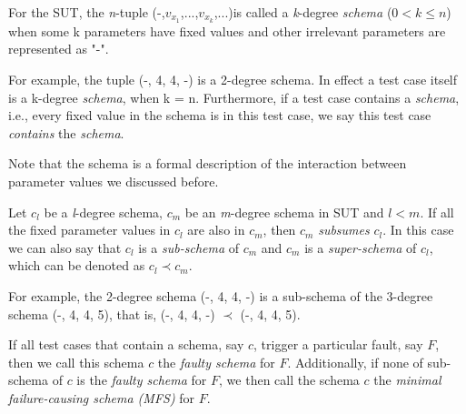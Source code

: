 \documentclass{sig-alternate-05-2015}
\begin{document}


\begin{definition}
For the SUT, the \emph{n}-tuple (-,$v_{x_{1}}$,...,$v_{x_{k}}$,...)is called a \emph{k}-degree \emph{schema} ($0 < k \leq n $) when some k parameters have fixed values and other irrelevant parameters are represented as "-".
\end{definition}

For example, the tuple (-, 4, 4, -) is a 2-degree schema. In effect a test case itself is a k-degree \emph{schema}, when k = n. Furthermore, if a test case contains a \emph{schema}, i.e., every fixed value in the schema is in this test case, we say this test case \emph{contains} the \emph{schema}.

Note that the schema is a formal description of the interaction between parameter values we discussed before.

\begin{definition}
Let $c_{l}$ be a \emph{l}-degree schema, $c_{m}$ be an \emph{m}-degree schema in SUT and $l < m$. If all the fixed parameter values in $c_{l}$ are also in $c_{m}$, then $c_{m}$ \emph{subsumes} $c_{l}$. In this case we can also say that $c_{l}$ is a \emph{sub-schema} of $c_{m}$ and $c_{m}$ is a \emph{super-schema} of $c_{l}$, which can be denoted as $c_{l} \prec  c_{m}$.
\end{definition}

For example,  the 2-degree schema (-, 4, 4, -) is a sub-schema of the 3-degree schema (-, 4, 4, 5), that is, (-, 4, 4, -) $\prec$ (-, 4, 4, 5).

\begin{definition}
If all test cases that contain a schema, say $c$, trigger a particular fault, say $F$, then we call this schema $c$ the \emph{faulty schema} for $F$. Additionally, if none of sub-schema of $c$ is the \emph{faulty schema} for $F$, we then call the schema $c$ the \emph{minimal failure-causing schema (MFS)} \cite{nie2011minimal} for $F$.

\end{definition}
\end{document}
